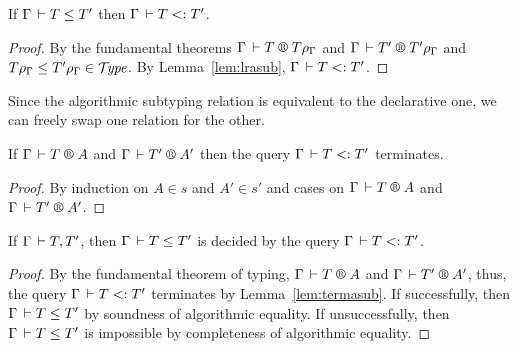 \begin{corollary}
\label{cor:complasub}
If\/ $\Gamma \,\vdash T \leq T'$ then $\Gamma \,\vdash T \mathrel{{<}{:}} T'$.
\end{corollary}
\begin{proof}
  By the fundamental theorems $\RG \Gamma T {T\rhog}$ and $\RG \Gamma {T'} {T'\rhog}$ and $T\rho_\Gamma \leq T'\rho_\Gamma \in \mathcal{T}\!\mathit{ype}$.
  By Lemma~\ref{lem:lrasub}, $\Gamma \,\vdash T \mathrel{{<}{:}} T'$.
\end{proof}

Since the algorithmic subtyping relation is equivalent to the declarative one, we can freely swap one relation for the other.

\begin{lemma}
  \label{lem:termasub}
  If\/ $\RG \Gamma T A$ and $\RG \Gamma {T'} {A'}$ then the query $\Gamma \,\vdash T \mathrel{{<}{:}} T'$ terminates.
\end{lemma}
\begin{proof}
  By induction on $A \in s$ and $A' \in s'$ and cases on $\RG \Gamma T A$ and $\RG \Gamma {T'} {A'}$.
\end{proof}

\begin{theorem}
  If\/ $\Gamma \,\vdash T,T'$, then $\Gamma \,\vdash T \leq T'$ is decided by the query $\Gamma \,\vdash T \mathrel{{<}{:}} T'$.
\end{theorem}
\begin{proof}
  By the fundamental theorem of typing, $\RG \Gamma T A$ and $\RG \Gamma {T'} {A'}$,
  thus, the query  $\Gamma \,\vdash T \mathrel{{<}{:}} T'$ terminates by Lemma~\ref{lem:termasub}.
  If successfully, then $\Gamma \,\vdash T \leq T'$ by soundness of algorithmic equality.
  If unsuccessfully, then $\Gamma \,\vdash T \leq T'$ is impossible by completeness of algorithmic equality.
\end{proof}


